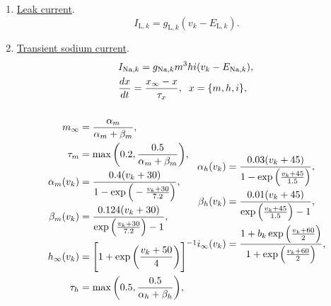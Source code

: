 \documentclass[../main.tex]{subfiles}
\begin{document}
\begin{enumerate}
    \item \underline{Leak current}.
        \begin{equation}
            I_{\text{L},k} = g_{\text{L},k}(v_k - E_{\text{L},k}). 
            \label{eq:pyr-leak-current}
        \end{equation}      
    \item \underline{Transient sodium current}. 
        \begin{equation}
        \begin{aligned}
            &\hspace{-2.8cm}I_{\text{Na},k} = g_{\text{Na},k} m^3hi(v_k-E_{\text{Na},k}), \\
        &\hspace{-2.8cm}\displaystyle\frac{dx}{dt} = \displaystyle\frac{x_\infty-x}{\tau_x}, \hspace{0.2cm} x = \{ m,h,i\},\\
        & \\
        \begin{aligned}
            m_\infty &= \displaystyle\frac{\alpha_m}{\alpha_m+\beta_m},\\%
            \tau_m &= \max \bigg(0.2, \displaystyle\frac{0.5}{\alpha_m+\beta_m}\bigg),\\
            \alpha_m(v_k) &= \displaystyle\frac{0.4(v_k+30)}{1-\exp{\Big(-\frac{v_k+30}{7.2}\Big)}},\\ %
            \beta_m(v_k)   &= \displaystyle\frac{0.124(v_k+30)}{\exp{\Big(\frac{v_k+30}{7.2}\Big)-1}}, \\
            h_\infty(v_k) &= \Bigg[1+\exp{\bigg(\frac{v_k+50}{4} \bigg)}\Bigg]^{-1}\\ %
            \tau_{h} &= \max\bigg(0.5, \displaystyle\frac{0.5}{\alpha_h+\beta_h}\bigg), \\
        \end{aligned}
        & 
        \begin{aligned}
            \alpha_h(v_k) &= \displaystyle\frac{0.03(v_k+45)}{1-\exp{\Big(\frac{v_k+45}{1.5}\Big)}},\\ %
            \beta_h(v_k)  &= \displaystyle\frac{0.01(v_k+45)}{\exp{\Big( \frac{v_k + 45}{1.5}\Big)}-1}, \\
            i_\infty(v_k) &= \displaystyle\frac{1+b_k\exp{\Big(\frac{v_k+60}{2} \Big)}}{1+\exp{\Big( \frac{v_k+60}{2}\Big)}}, \\ %

\end{aligned}
\end{aligned}
\end{equation}
\end{enumerate}
\end{document}
